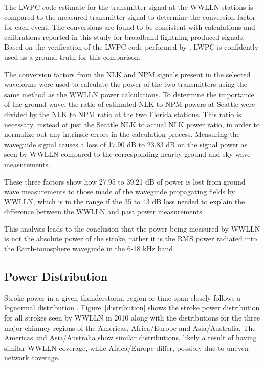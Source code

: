 The LWPC code estimate for the transmitter signal at the WWLLN stations is compared to the measured transmitter signal to determine the conversion factor for each event.
The conversions are found to be consistent with calculations and calibrations reported in this study for broadband lightning produced signals.
Based on the verification of the LWPC code performed by \citet{Thomson2010}, LWPC is confidently used as a ground truth for this comparison.

The conversion factors from the NLK and NPM signals present in the selected waveforms were used to calculate the power of the two transmitters using the same method as the WWLLN power calculations.
To determine the importance of the ground wave, the ratio of estimated NLK to NPM powers at Seattle were divided by the NLK to NPM ratio at the two Florida stations.
This ratio is necessary, instead of just the Seattle NLK to actual NLK power ratio, in order to normalize out any intrinsic errors in the calculation process.
Measuring the waveguide signal causes a loss of 17.90 dB to 23.83 dB on the signal power as seen by WWLLN compared to the corresponding nearby ground and sky wave measurements.

These three factors show how 27.95 to 39.21 dB of power is lost from ground wave measurements to those made of the waveguide propagating fields by WWLLN, which is in the range if the 35 to 43 dB loss needed to explain the difference between the WWLLN and past power measurements.

This analysis leads to the conclusion that the power being measured by WWLLN is not the absolute power of the stroke, rather it is the RMS power radiated into the Earth-ionosphere waveguide in the 6-18 kHz band.

\subsection{Power Distribution}

Stroke power in a given thunderstorm, region or time span closely follows a lognormal distribution \citep{Golde1977}. Figure~\ref{distribution} shows the stroke power distribution for all strokes seen by WWLLN in 2010 along with the distributions for the three major chimney regions of the Americas, Africa/Europe and Asia/Australia.
The Americas and Asia/Australia show similar distributions, likely a result of having similar WWLLN coverage, while Africa/Europe differ, possibly due to uneven network coverage.

